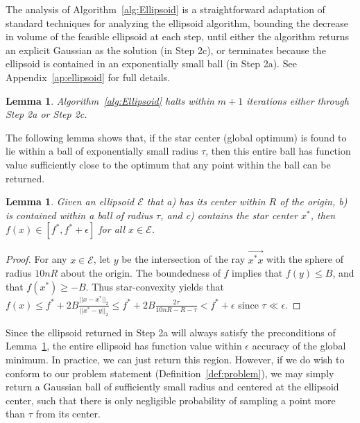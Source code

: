 \documentclass[11pt,letter]{article}
\newcommand{\ferr}{\epsilon}
\newcounter{nTheorems}
\numberwithin{nTheorems}{section}
\newtheorem{lemma}[nTheorems]{Lemma}
\begin{document}
The analysis of Algorithm~\ref{alg:Ellipsoid} is a straightforward adaptation of standard techniques for analyzing the ellipsoid algorithm, bounding the decrease in volume of the feasible ellipsoid at each step, until either the algorithm returns an explicit Gaussian as the solution (in Step 2c), or terminates because the ellipsoid is contained in an exponentially small ball (in Step 2a). See Appendix~\ref{ap:ellipsoid} for full details.

\begin{lemma}
\label{lem:EllipsoidHalt}
Algorithm~\ref{alg:Ellipsoid} halts within $m+1$ iterations either through Step 2a or Step 2c.
\end{lemma}



The following lemma shows that, if the star center (global optimum) is found to lie within a ball of exponentially small radius $\tau$, then this entire ball has function value sufficiently close to the optimum that any point within the ball can be returned.

\begin{lemma}
\label{lem:TinyRadius}
Given an ellipsoid $\mathcal{E}$ that a) has its center within $R$ of the origin, b) is contained within a ball of radius $\tau$, and c) contains the star center $x^\ast$, then $f(x)\in [f^\ast,f^\ast+\ferr]$ for all $x\in \mathcal{E}$.
\end{lemma}

\begin{proof}
For any $x\in\mathcal{E}$, let $y$ be the intersection of the ray $\overrightarrow{x^*x}$ with the sphere of radius $10nR$ about the origin. The boundedness of $f$ implies that $f(y)\leq B$, and that $f(x^\ast)\geq -B$. Thus star-convexity yields that $f(x)\leq f^\ast+2B\frac{||x-x^\ast||_2}{||x^\ast-y||_2}\leq f^\ast+2B\frac{2\tau}{10nR-R-\tau} < f^\ast+\ferr$ since $\tau \ll \ferr$.
\end{proof}

Since the ellipsoid returned in Step 2a will always satisfy the preconditions of Lemma~\ref{lem:TinyRadius}, the entire ellipsoid has function value within $\ferr$ accuracy of the global minimum.
In practice, we can just return this region.
However, if we do wish to conform to our problem statement (Definition~\ref{def:problem}), we may simply return a Gaussian ball of sufficiently small radius and centered at the ellipsoid center, such that there is only negligible probability of sampling a point more than $\tau$ from its center.
\end{document}
